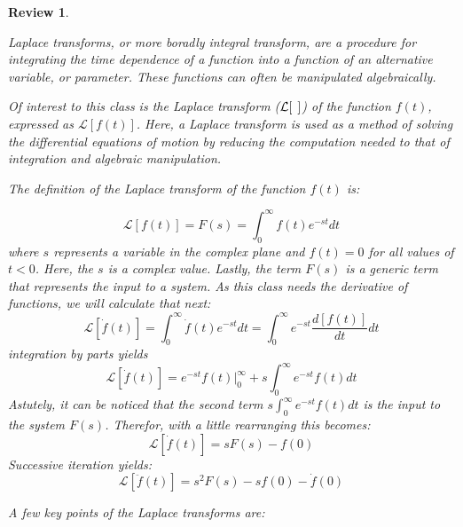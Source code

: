 \documentclass[12pt,letter]{article}
\numberwithin{ex}{section} %
\newtheorem{re}{Review}
\numberwithin{re}{section} %
\newenvironment{review}{\begin{mdframed}[middlelinewidth=2mm,roundcorner=20pt]\begin{re}\normalfont}{\end{re}\end{mdframed}}
\newcommand{\Laplace}[1]{\ensuremath{\mathcal{L}{\left[#1\right]}}}
\begin{document}
\begin{review}
	\label{sec:Laplace_review}
				
		Laplace transforms, or more boradly integral transform, are a procedure for integrating the time dependence of a function into a function of an alternative variable, or parameter. These functions can often be manipulated algebraically. 
		
		Of interest to this class is the Laplace transform ($\Laplace{\hspace{1ex}}$) of the function $f(t)$, expressed as $\Laplace{f(t)}$. Here, a Laplace transform is used as a method of solving the differential equations of motion by reducing the computation needed to that of integration and algebraic manipulation. 
		
		The definition of the Laplace transform of the function $f(t)$ is:
		
		\begin{equation}
				\Laplace{f(t)} = F(s) = \int_{0}^{\infty} f(t)e^{-st}dt
		\end{equation}
		where $s$ represents a variable in the complex plane and $f(t)=0$ for all values of $t<0$. Here, the $s$ is a complex value. Lastly, the term $F(s)$ is a generic term that  represents the input to a system. As this class needs the derivative of functions, we will calculate that next:
		\begin{equation}
			\Laplace{\dot{f}(t)} = \int_{0}^{\infty} \dot{f}(t)e^{-st}dt = \int_{0}^{\infty} e^{-st}\frac{d[f(t)]}{dt}dt 
		\end{equation}		
		integration by parts yields
		\begin{equation}
			\Laplace{\dot{f}(t)} = e^{-st}f(t)\Big|_0^\infty+s\int_{0}^{\infty}e^{-st}f(t)dt
		\end{equation}
		Astutely, it can be noticed that the second term $s\int_{0}^{\infty}e^{-st}f(t)dt$
		is the input to the system $F(s)$. Therefor, with a little rearranging this becomes:
		\begin{equation}
			\Laplace{\dot{f}(t)} = sF(s)-f(0)
		\end{equation}
		Successive iteration yields:
		\begin{equation}
			\Laplace{\ddot{f}(t)} = s^2F(s)-sf(0)-\dot{f}(0)
		\end{equation}
		
		A few key points of the Laplace transforms are:
				

\end{review}
\end{document}
